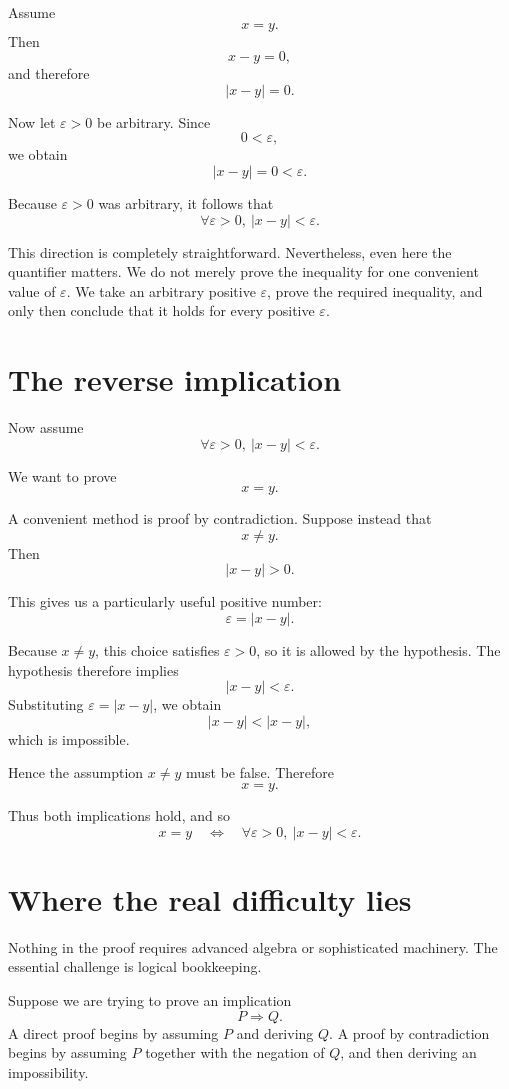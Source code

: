 \documentclass{essay}
\begin{document}
Assume
\[
x=y.
\]
Then
\[
x-y=0,
\]
and therefore
\[
|x-y|=0.
\]

Now let \(\varepsilon>0\) be arbitrary. Since
\[
0<\varepsilon,
\]
we obtain
\[
|x-y|=0<\varepsilon.
\]

Because \(\varepsilon>0\) was arbitrary, it follows that
\[
\forall \varepsilon>0,\ |x-y|<\varepsilon.
\]

This direction is completely straightforward. Nevertheless, even here the quantifier matters. We do not merely prove the inequality for one convenient value of \(\varepsilon\). We take an arbitrary positive \(\varepsilon\), prove the required inequality, and only then conclude that it holds for every positive \(\varepsilon\).

\section{The reverse implication}

Now assume
\[
\forall \varepsilon>0,\ |x-y|<\varepsilon.
\]

We want to prove
\[
x=y.
\]

A convenient method is proof by contradiction. Suppose instead that
\[
x\ne y.
\]
Then
\[
|x-y|>0.
\]

This gives us a particularly useful positive number:
\[
\varepsilon=|x-y|.
\]

Because \(x\ne y\), this choice satisfies \(\varepsilon>0\), so it is allowed by the hypothesis. The hypothesis therefore implies
\[
|x-y|<\varepsilon.
\]
Substituting \(\varepsilon=|x-y|\), we obtain
\[
|x-y|<|x-y|,
\]
which is impossible.

Hence the assumption \(x\ne y\) must be false. Therefore
\[
x=y.
\]

Thus both implications hold, and so
\[
x=y
\quad\Longleftrightarrow\quad
\forall \varepsilon>0,\ |x-y|<\varepsilon.
\]

\section{Where the real difficulty lies}

Nothing in the proof requires advanced algebra or sophisticated machinery. The essential challenge is logical bookkeeping.

Suppose we are trying to prove an implication
\[
P\Longrightarrow Q.
\]
A direct proof begins by assuming \(P\) and deriving \(Q\). A proof by contradiction begins by assuming \(P\) together with the negation of \(Q\), and then deriving an impossibility.
\end{document}
